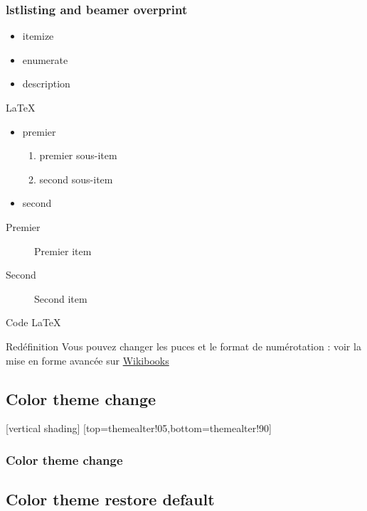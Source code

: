 \documentclass[utf8]{beamer}
\begin{document}
\begin{frame}[fragile]
  \frametitle{lstlisting and beamer overprint}
  \begin{itemize}
      \pause \item itemize
      \pause \item enumerate
      \pause \item description
  \end{itemize}
  \begin{overprint}
    \begin{exampleblock}{\LaTeX}
      {\tiny\begin{itemize}
      \item premier
        \begin{enumerate}
        \item premier sous-item
        \item second sous-item
        \end{enumerate}
      \item second
      \end{itemize}
      \begin{description}
        \item[Premier] Premier item
        \item[Second] Second item
      \end{description}}
    \end{exampleblock}
    \begin{block}{Code \LaTeX}
      {\usebox{\lstbox}}
    \end{block}
    \begin{block}{Red\'efinition}
      Vous pouvez changer les puces et le format de num\'erotation : voir la
      mise en forme avanc\'ee sur \href{http://fr.wikibooks.org/wiki/LaTeX/}{Wikibooks}
    \end{block}
  \end{overprint}
\end{frame}


\subsection{Color theme change}

[vertical shading]%
[top=themealter!05,bottom=themealter!90]
\begin{frame}
\frametitle{Color theme change}
\end{frame}

\subsection{Color theme restore default}
\end{document}
